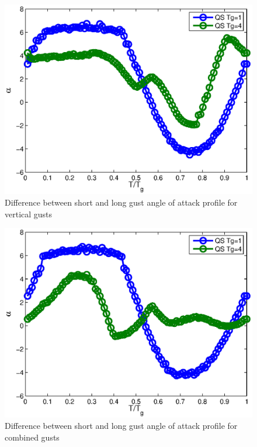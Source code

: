 \begin{figure}[h]
  \centering
  \includegraphics{./Figures/alpha_vs_Tg_QS_short_vs_long_wt1.eps}
  \caption{Difference between short and long gust angle of attack profile for vertical gusts}
  \label{fig:short_vs_long_qs_wt=1}
\end{figure}

\begin{figure}[h]
  \centering
  \includegraphics{./Figures/alpha_vs_Tg_QS_short_vs_long_wt3.eps}
  \caption{Difference between short and long gust angle of attack profile for combined gusts}
  \label{fig:short_vs_long_qs_wt=3}
\end{figure}

